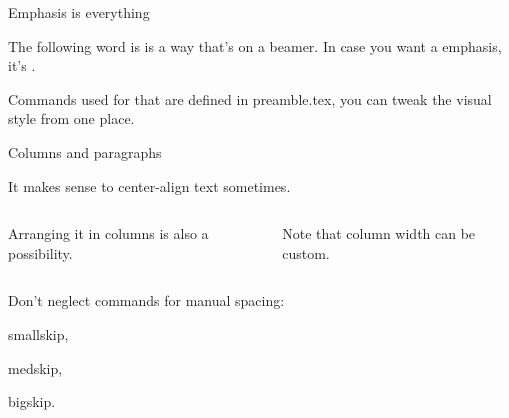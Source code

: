 \begin{frame}{Emphasis is everything}

	The following word is  is a way that's  on a beamer.
	In case you want a  emphasis, it's .
	
	\bigskip
	
	Commands used for that are defined in preamble.tex, you can tweak the visual style from one place.

\end{frame}

\begin{frame}{Columns and paragraphs}

	\begin{center}

		It makes sense to center-align text sometimes.		
		
	\end{center}

	\begin{columns}
		
		\begin{column}{0.4\textwidth}
		
			Arranging it in columns is also a possibility.
			
		\end{column}	
		
		\begin{column}{0.6\textwidth}
		
			Note that column width can be custom.		
		
		\end{column}		
		
	\end{columns}
	
	\bigskip
	
	Don't neglect commands for manual spacing: 
	\smallskip
	
	smallskip,
	\medskip
	
	medskip,
	\bigskip	
	
	bigskip.

\end{frame}

